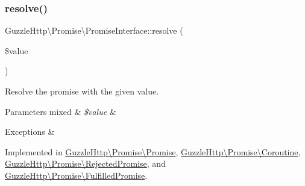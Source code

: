 \mbox{\label{interfaceGuzzleHttp_1_1Promise_1_1PromiseInterface_ae39a5f1a81903f74af5114c272bf7b7b}} 
\subsubsection{\texorpdfstring{resolve()}{resolve()}}
{\footnotesize\ttfamily Guzzle\+Http\textbackslash{}\+Promise\textbackslash{}\+Promise\+Interface\+::resolve (\begin{DoxyParamCaption}\item[{}]{\$value }\end{DoxyParamCaption})}

Resolve the promise with the given value.


\begin{DoxyParams}[1]{Parameters}
mixed & {\em \$value} & \\
\hline
\end{DoxyParams}

\begin{DoxyExceptions}{Exceptions}
{\em } & \\
\hline
\end{DoxyExceptions}


Implemented in \hyperlink{classGuzzleHttp_1_1Promise_1_1Promise_ac36ed471a473ef124c4561d8351d39fb}{Guzzle\+Http\textbackslash{}\+Promise\textbackslash{}\+Promise}, \hyperlink{classGuzzleHttp_1_1Promise_1_1Coroutine_a3af6486dd13c854b6598c7806addf87d}{Guzzle\+Http\textbackslash{}\+Promise\textbackslash{}\+Coroutine}, \hyperlink{classGuzzleHttp_1_1Promise_1_1RejectedPromise_a7ae165802820c8c9afa1d4d2697c3c58}{Guzzle\+Http\textbackslash{}\+Promise\textbackslash{}\+Rejected\+Promise}, and \hyperlink{classGuzzleHttp_1_1Promise_1_1FulfilledPromise_aa4e349787515ae99e597a91f7f7e5dbe}{Guzzle\+Http\textbackslash{}\+Promise\textbackslash{}\+Fulfilled\+Promise}.

\mbox{\label{interfaceGuzzleHttp_1_1Promise_1_1PromiseInterface_a2f1174c4a67f1b7fb1a74d37466bc90a}} 
